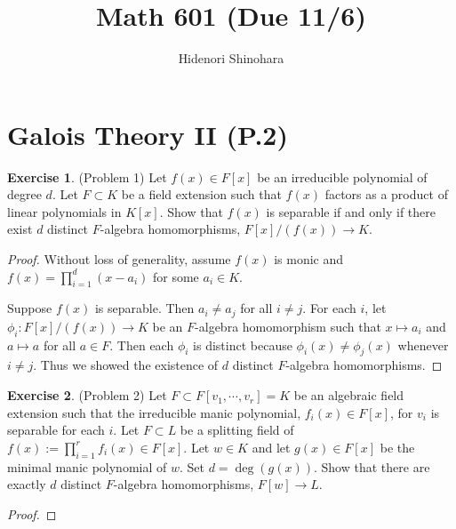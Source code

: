 \documentclass[12pt, psamsfonts]{amsart}
\theoremstyle{definition}
\newtheorem*{exer}{Exercise}
\theoremstyle{remark}
\numberwithin{equation}{section}
\begin{document}
\title{Math 601 (Due 11/6)}
\author{Hidenori Shinohara}
\maketitle

\tableofcontents

\section{Galois Theory II (P.2)}

\begin{exer}{(Problem 1)}
  Let $f(x) \in F[x]$ be an irreducible polynomial of degree $d$.
  Let $F \subset K$ be a field extension such that $f(x)$ factors as a product of linear polynomials in $K[x]$.
  Show that $f(x)$ is separable if and only if there exist $d$ distinct $F$-algebra homomorphisms, $F[x]/(f(x)) \rightarrow K$.
\end{exer}

\begin{proof}
  Without loss of generality, assume $f(x)$ is monic and $f(x) = \prod_{i=1}^{d} (x - a_i)$ for some $a_i \in K$.

  Suppose $f(x)$ is separable.
  Then $a_i \ne a_j$ for all $i \ne j$.
  For each $i$, let $\phi_i: F[x]/(f(x)) \rightarrow K$ be an $F$-algebra homomorphism such that $x \mapsto a_i$ and $a \mapsto a$ for all $a \in F$.
  Then each $\phi_i$ is distinct because $\phi_i(x) \ne \phi_j(x)$ whenever $i \ne j$.
  Thus we showed the existence of $d$ distinct $F$-algebra homomorphisms.

\end{proof}

\begin{exer}{(Problem 2)}
  Let $F \subset F[v_1, \cdots, v_r] = K$ be an algebraic field extension such that the irreducible manic polynomial, $f_i(x) \in F[x]$, for $v_i$ is separable for each $i$.
  Let $F \subset L$ be a splitting field of $f(x) := \prod_{i=1}^r f_i(x) \in F[x]$.
  Let $w \in K$ and let $g(x) \in F[x]$ be the minimal manic polynomial of $w$.
  Set $d = \deg(g(x))$.
  Show that there are exactly $d$ distinct $F$-algebra homomorphisms, $F[w] \rightarrow L$.
\end{exer}

\begin{proof}
\end{proof}
\end{document}
